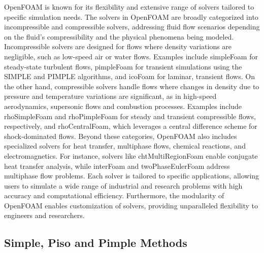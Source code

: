 \documentclass[a5paper]{sapthesis}
\begin{document}
	OpenFOAM is known for its flexibility and extensive range of solvers tailored to specific simulation needs. The solvers in OpenFOAM are broadly categorized into incompressible and compressible solvers, addressing fluid flow scenarios depending on the fluid’s compressibility and the physical phenomena being modeled. Incompressible solvers are designed for flows where density variations are negligible, such as low-speed air or water flows. Examples include simpleFoam for steady-state turbulent flows, pimpleFoam for transient simulations using the SIMPLE and PIMPLE algorithms, and icoFoam for laminar, transient flows. On the other hand, compressible solvers handle flows where changes in density due to pressure and temperature variations are significant, as in high-speed aerodynamics, supersonic flows and combustion processes. Examples include rhoSimpleFoam and rhoPimpleFoam for steady and transient compressible flows, respectively, and rhoCentralFoam, which leverages a central difference scheme for shock-dominated flows. Beyond these categories, OpenFOAM also includes specialized solvers for heat transfer, multiphase flows, chemical reactions, and electromagnetics. For instance, solvers like chtMultiRegionFoam enable conjugate heat transfer analysis, while interFoam and twoPhaseEulerFoam address multiphase flow problems. Each solver is tailored to specific applications, allowing users to simulate a wide range of industrial and research problems with high accuracy and computational efficiency. Furthermore, the modularity of OpenFOAM enables customization of solvers, providing unparalleled flexibility to engineers and researchers.
	
	\subsection*{Simple, Piso and Pimple Methods}
	
\end{document}
